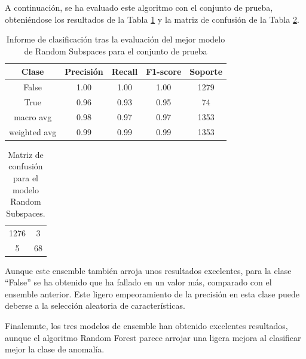 \documentclass[12pt,letterpaper]{article}
\begin{document}
A continuación, se ha evaluado este algoritmo con el conjunto de prueba, obteniéndose los resultados de la Tabla \ref{tab:res-RS} y la matriz de confusión de la Tabla \ref{tab:confusion-RS}. 
\begin{table}[H]
    \centering
    \begin{tabular}{ccccc}
    \hline
    \textbf{Clase} & \textbf{Precisión} & \textbf{Recall} & \textbf{F1-score} & \textbf{Soporte} \\ \hline
    False & 1.00& 1.00 &  1.00 & 1279 \\ 
    True & 0.96 & 0.93 & 0.95 &  74 \\ 
    macro avg &  0.98 & 0.97 & 0.97 & 1353 \\ 
    weighted avg & 0.99 &  0.99 & 0.99 & 1353 \\ 
    \hline
    \end{tabular}
    \caption{Informe de clasificación tras la evaluación del mejor modelo de Random Subspaces para el conjunto de prueba}
    \label{tab:res-RS}
\end{table}

\begin{table}[H]
    \centering
    \begin{tabular}{|cc|}
    \hline
    1276 & 3 \\
    5 & 68 \\ \hline 
    \end{tabular}
    \caption{Matriz de confusión para el modelo Random Subspaces.}
    \label{tab:confusion-RS}
\end{table}

Aunque este ensemble también arroja unos resultados excelentes, para la clase ``False'' se ha obtenido que ha fallado en un valor más, comparado con el ensemble anterior. Este ligero empeoramiento de la precisión en esta clase puede deberse a la selección aleatoria de características.

Finalemnte, los tres modelos de ensemble han obtenido excelentes resultados, aunque el algoritmo Random Forest parece arrojar una ligera mejora al clasificar mejor la clase de anomalía.

\printbibliography
\end{document}
